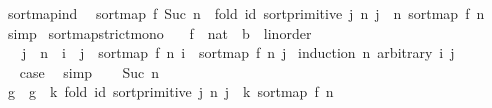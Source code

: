 \begin{isabellebody}
\isanewline
{}\isamarkupfalse%
\ sort{\isacharunderscore}{\kern0pt}map{\isacharunderscore}{\kern0pt}ind{\isacharcolon}{\kern0pt}\isanewline
\ \ {\isachardoublequoteopen}sort{\isacharunderscore}{\kern0pt}map\ f\ {\isacharparenleft}{\kern0pt}Suc\ n{\isacharparenright}{\kern0pt}\ {\isacharequal}{\kern0pt}\ fold\ id\ {\isacharbrackleft}{\kern0pt}sort{\isacharunderscore}{\kern0pt}primitive\ j\ n{\isachardot}{\kern0pt}\ j\ {\isacharless}{\kern0pt}{\isacharminus}{\kern0pt}\ {\isacharbrackleft}{\kern0pt}{}{\isachardot}{\kern0pt}{\isachardot}{\kern0pt}{\isacharless}{\kern0pt}n{\isacharbrackright}{\kern0pt}{\isacharbrackright}{\kern0pt}\ {\isacharparenleft}{\kern0pt}sort{\isacharunderscore}{\kern0pt}map\ f\ n{\isacharparenright}{\kern0pt}{\isachardoublequoteclose}\isanewline
%
\isadelimproof
\ \ %
\endisadelimproof
%
\isatagproof
{}\isamarkupfalse%
\ simp%
\endisatagproof
{\isafoldproof}%
%
\isadelimproof
\isanewline
%
\endisadelimproof
\isanewline
{}\isamarkupfalse%
\ sort{\isacharunderscore}{\kern0pt}map{\isacharunderscore}{\kern0pt}strict{\isacharunderscore}{\kern0pt}mono{\isacharcolon}{\kern0pt}\isanewline
\ \ \ f\ {\isacharcolon}{\kern0pt}{\isacharcolon}{\kern0pt}\ {\isachardoublequoteopen}nat\ {\isasymRightarrow}\ {\isacharprime}{\kern0pt}b\ {\isacharcolon}{\kern0pt}{\isacharcolon}{\kern0pt}\ linorder{\isachardoublequoteclose}\isanewline
\ \ \ {\isachardoublequoteopen}j\ {\isacharless}{\kern0pt}\ n\ {\isasymLongrightarrow}\ i\ {\isacharless}{\kern0pt}\ j\ {\isasymLongrightarrow}\ sort{\isacharunderscore}{\kern0pt}map\ f\ n\ i\ {\isasymle}\ sort{\isacharunderscore}{\kern0pt}map\ f\ n\ j{\isachardoublequoteclose}\isanewline
%
\isadelimproof
%
\endisadelimproof
%
\isatagproof
{}\isamarkupfalse%
\ {\isacharparenleft}{\kern0pt}induction\ n\ arbitrary{\isacharcolon}{\kern0pt}\ i\ j{\isacharparenright}{\kern0pt}\isanewline
\ \ \isamarkupfalse%
\ {}\isanewline
\ \ \isamarkupfalse%
\ \isamarkupfalse%
\ {\isacharquery}{\kern0pt}case\ \isamarkupfalse%
\ simp\isanewline
{}\isamarkupfalse%
\isanewline
\ \ \isamarkupfalse%
\ {\isacharparenleft}{\kern0pt}Suc\ n{\isacharparenright}{\kern0pt}\isanewline
\ \ \isamarkupfalse%
\ g\ \ {\isachardoublequoteopen}g\ {\isacharequal}{\kern0pt}\ {\isacharparenleft}{\kern0pt}{\isasymlambda}k{\isachardot}{\kern0pt}\ fold\ id\ {\isacharbrackleft}{\kern0pt}sort{\isacharunderscore}{\kern0pt}primitive\ j\ n{\isachardot}{\kern0pt}\ j\ {\isacharless}{\kern0pt}{\isacharminus}{\kern0pt}\ {\isacharbrackleft}{\kern0pt}{}{\isachardot}{\kern0pt}{\isachardot}{\kern0pt}{\isacharless}{\kern0pt}k{\isacharbrackright}{\kern0pt}{\isacharbrackright}{\kern0pt}\ {\isacharparenleft}{\kern0pt}sort{\isacharunderscore}{\kern0pt}map\ f\ n{\isacharparenright}{\kern0pt}{\isacharparenright}{\kern0pt}{\isachardoublequoteclose}\isanewline

\end{isabellebody}

